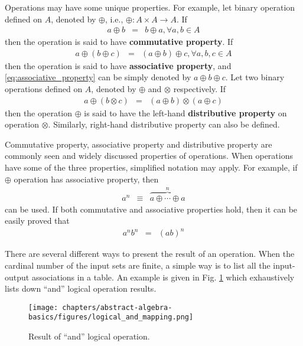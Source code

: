 Operations may have some unique properties. For example, let binary operation defined on $A$, denoted by $\oplus $, i.e., $\oplus: A\times A \rightarrow A$. If
\begin{eqnarray}
	a \oplus b &=& b \oplus a, \forall a, b \in A \nonumber
\end{eqnarray}
then the operation is said to have \textbf{commutative property}. If
\begin{eqnarray}
	a \oplus (b \oplus c) &=& (a \oplus b) \oplus c, \forall a,b,c \in A \label{eq:associative_property}
\end{eqnarray}
then the operation is said to have \textbf{associative property}, and \eqref{eq:associative_property} can be simply denoted by $a \oplus b \oplus c$. Let two binary operations defined on $A$, denoted by $\oplus$ and $\otimes$ respectively. If
\begin{eqnarray}
	a \oplus (b \otimes c) &=& (a \oplus b) \otimes (a \oplus c) \nonumber
\end{eqnarray}
then the operation $\oplus$ is said to have the left-hand \textbf{distributive property} on operation $\otimes$. Similarly, right-hand distributive property can also be defined.  

Commutative property, associative property and distributive property are commonly seen and widely discussed properties of operations. When operations have some of the three properties, simplified notation may apply. For example, if $\oplus$ operation has associative property, then
\begin{eqnarray}
	a^n &\equiv& \overbrace{a \oplus \cdots \oplus a}^{n} \nonumber
\end{eqnarray}
can be used. If both commutative and associative properties hold, then it can be easily proved that
\begin{eqnarray}
	a^nb^n & = & (ab)^n \nonumber 
\end{eqnarray}

There are several different ways to present the result of an operation. When the cardinal number of the input sets are finite, a simple way is to list all the input-output associations in a table. An example is given in Fig. \ref{fig:logical_and_mapping} which exhaustively lists down ``and'' logical operation results.
\begin{figure}[htbp]
	\centering
	\texttt{[image: chapters/abstract-algebra-basics/figures/logical\_and\_mapping.png]}
	\caption{Result of ``and'' logical operation.} \label{fig:logical_and_mapping}
\end{figure}

